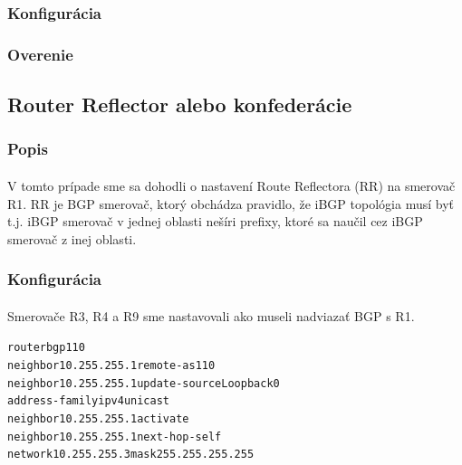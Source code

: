 \documentclass[12pt,twoside,a4paper]{report}
\begin{document}
\subsubsection{Konfigurácia}
\paragraph{}

\subsubsection{Overenie}
\paragraph{}






\subsection{Router Reflector alebo konfederácie}
\subsubsection{Popis}
\paragraph{}
V tomto prípade sme sa dohodli o nastavení Route Reflectora (RR) na smerovač R1. RR je BGP smerovač, ktorý obchádza pravidlo, že iBGP topológia musí byť  t.j. iBGP smerovač v jednej oblasti nešíri prefixy, ktoré sa naučil cez iBGP smerovač z inej oblasti.



\subsubsection{Konfigurácia}
\paragraph{}
Smerovače R3, R4 a R9 sme nastavovali ako museli nadviazať BGP s R1.

\noindent
{\selectfont
\begin{small}
\begin{alltt}
router bgp 110
  neighbor 10.255.255.1 remote-as 110
  neighbor 10.255.255.1 update-source Loopback0
  address-family ipv4 unicast
    neighbor 10.255.255.1 activate
    neighbor 10.255.255.1 next-hop-self
  network 10.255.255.3 mask 255.255.255.255
\end{alltt}
\end{small}
}
\end{document}
